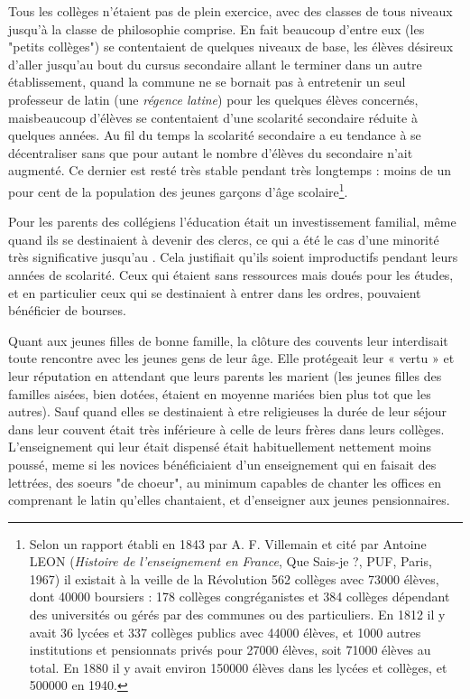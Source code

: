 Tous les collèges n'étaient pas de plein exercice, avec des classes de tous niveaux jusqu'à la classe de philosophie comprise. En fait beaucoup d'entre eux (les "petits collèges") se contentaient de quelques niveaux de base, les élèves désireux d'aller jusqu'au bout du cursus secondaire allant le terminer dans un autre établissement, quand la commune ne se bornait pas à entretenir un seul professeur de latin (une \emph{régence latine}) pour les quelques élèves concernés, maisbeaucoup d'élèves se contentaient d'une scolarité secondaire réduite à quelques années. Au fil du temps la scolarité secondaire a eu tendance à se décentraliser sans que pour autant le nombre d'élèves du secondaire n'ait augmenté. Ce dernier est resté très stable pendant très longtemps : moins de un pour cent de la population des jeunes garçons d'âge scolaire\footnote{Selon un rapport établi en 1843 par A. F. Villemain  et cité par Antoine LEON (\emph{Histoire de l'enseignement en France}, Que Sais-je ?, PUF, Paris, 1967) il existait à la veille de la Révolution 562 collèges avec 73000 élèves, dont 40000 boursiers : 178 collèges congréganistes et 384 collèges dépendant des universités ou gérés par des communes ou des particuliers. En 1812 il y avait 36 lycées et 337 collèges publics avec 44000 élèves, et 1000 autres institutions et pensionnats privés pour 27000 élèves, soit 71000 élèves au total. En 1880 il y avait environ 150000 élèves dans les lycées et collèges, et 500000 en 1940.}. 
 
 Pour les parents des collégiens l'éducation était un investissement familial, même quand ils se destinaient à devenir des clercs, ce qui a été le cas d'une minorité très significative jusqu'au . Cela justifiait qu'ils soient improductifs pendant leurs années de scolarité. Ceux qui étaient sans ressources mais doués pour les études, et en particulier ceux qui se destinaient à entrer dans les ordres, pouvaient bénéficier de bourses.




Quant aux jeunes filles de bonne famille, la clôture des couvents leur interdisait toute rencontre avec les jeunes gens de leur âge. Elle protégeait leur « vertu » et leur réputation en attendant que leurs parents les marient (les jeunes filles des familles aisées, bien dotées, étaient en moyenne mariées bien plus tot que les autres). Sauf quand elles se destinaient à etre religieuses la durée de leur séjour dans leur couvent était très inférieure à celle de leurs frères dans leurs collèges. L'enseignement qui leur était dispensé était habituellement nettement moins poussé, meme si les novices bénéficiaient d'un enseignement qui en faisait des lettrées, des soeurs "de choeur", au minimum capables de chanter les offices en comprenant le latin qu'elles chantaient, et d'enseigner aux jeunes pensionnaires.

